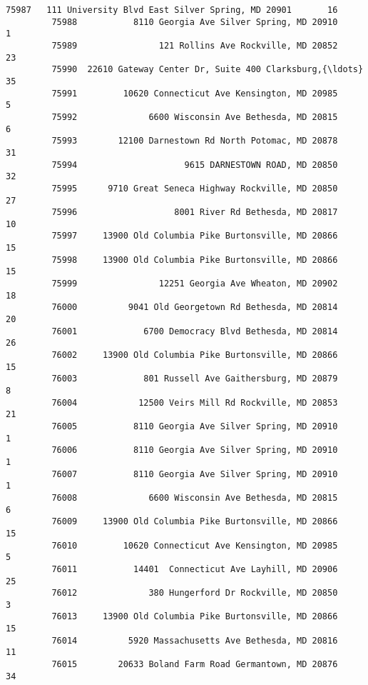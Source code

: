\documentclass[11pt]{article}
\begin{document}
\begin{Verbatim}[commandchars=\\\{\}]
         75987   111 University Blvd East Silver Spring, MD 20901       16   
         75988           8110 Georgia Ave Silver Spring, MD 20910        1   
         75989                121 Rollins Ave Rockville, MD 20852       23   
         75990  22610 Gateway Center Dr, Suite 400 Clarksburg,{\ldots}       35   
         75991         10620 Connecticut Ave Kensington, MD 20985        5   
         75992              6600 Wisconsin Ave Bethesda, MD 20815        6   
         75993        12100 Darnestown Rd North Potomac, MD 20878       31   
         75994                     9615 DARNESTOWN ROAD, MD 20850       32   
         75995      9710 Great Seneca Highway Rockville, MD 20850       27   
         75996                   8001 River Rd Bethesda, MD 20817       10   
         75997     13900 Old Columbia Pike Burtonsville, MD 20866       15   
         75998     13900 Old Columbia Pike Burtonsville, MD 20866       15   
         75999                12251 Georgia Ave Wheaton, MD 20902       18   
         76000          9041 Old Georgetown Rd Bethesda, MD 20814       20   
         76001             6700 Democracy Blvd Bethesda, MD 20814       26   
         76002     13900 Old Columbia Pike Burtonsville, MD 20866       15   
         76003             801 Russell Ave Gaithersburg, MD 20879        8   
         76004            12500 Veirs Mill Rd Rockville, MD 20853       21   
         76005           8110 Georgia Ave Silver Spring, MD 20910        1   
         76006           8110 Georgia Ave Silver Spring, MD 20910        1   
         76007           8110 Georgia Ave Silver Spring, MD 20910        1   
         76008              6600 Wisconsin Ave Bethesda, MD 20815        6   
         76009     13900 Old Columbia Pike Burtonsville, MD 20866       15   
         76010         10620 Connecticut Ave Kensington, MD 20985        5   
         76011           14401  Connecticut Ave Layhill, MD 20906       25   
         76012              380 Hungerford Dr Rockville, MD 20850        3   
         76013     13900 Old Columbia Pike Burtonsville, MD 20866       15   
         76014          5920 Massachusetts Ave Bethesda, MD 20816       11   
         76015        20633 Boland Farm Road Germantown, MD 20876       34   
         

\end{Verbatim}
\end{document}
